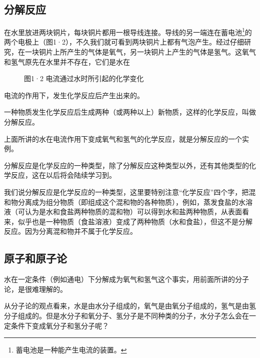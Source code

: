 \subsection{分解反应}

在水里放进两块铜片，每块铜片都用一根导线连接。导线的另一端连在蓄电池\footnote{蓄电池是一种能产生电流的装置。}的两个电极上（图1·2），不久我们就可看到两块铜片上都有气泡产生。经过仔细研究，在一块铜片上所产生的气体是氧气，另一块铜片上产生的气体是氢气。这氧气和氢气原先在水里并不存在，它们是水在

\begin{figure}
\centering
\caption{图1·2 电流通过水时所引起的化学变化}
\end{figure}

电流的作用下，发生化学反应后产生出来的。

一种物质发生化学反应后生成两种（或两种以上）新物质，这样的化学反应，叫做分解反应。

上面所讲的水在电流作用下变成氧气和氢气的化学反应，就是分解反应的一个实例。

分解反应是化学反应的一种类型，除了分解反应这种类型以外，还有其他类型的化学反应，这在以后将会陆续学习到。

我们说分解反应是化学反应的一种类型，这里要特别注意``化学反应''四个字，把混和物分离成为组分物质（即组成这个混和物的各种物质），例如，蒸发食盐的水溶液（可认为是水和食盐两种物质的混和物）可以得到水和盐两种物质，从表面看来，似乎也是一种物质（食盐溶液）变成了两种物质（水和食盐），但这不是分解反应。因为分离混和物并不属于化学反应。

\subsection{原子和原子论}

水在一定条件（例如通电）下分解成为氧气和氢气这个事实，用前面所讲的分子论，是很难理解的。

从分子论的观点看来，水是由水分子组成的，氧气是由氧分子组成的，氢气是由氢分子组成的。但是水分子和氧分子、氢分子是不同种类的分子，水分子怎么会在一定条件下变成氧分子和氢分子呢？

